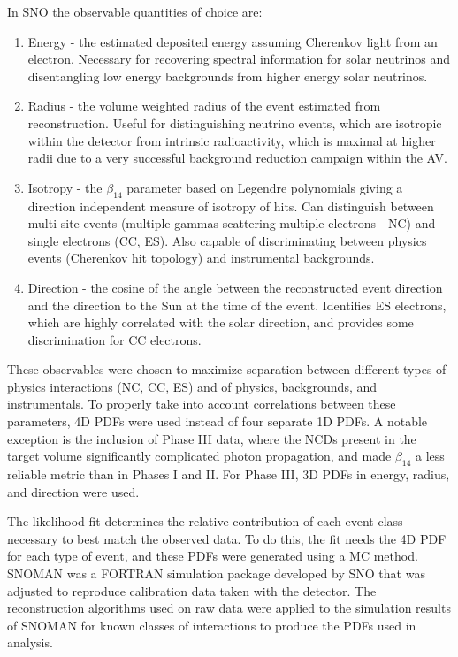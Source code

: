 In SNO the observable quantities of choice are:
\begin{enumerate}
    \item Energy - the estimated deposited energy assuming Cherenkov light from an electron. Necessary for recovering spectral information for solar neutrinos and disentangling low energy backgrounds from higher energy solar neutrinos.
    \item Radius - the volume weighted radius of the event estimated from reconstruction. Useful for distinguishing neutrino events, which are isotropic within the detector from intrinsic radioactivity, which is maximal at higher radii due to a very successful background reduction campaign within the AV.
    \item Isotropy - the $\beta_{14}$ parameter based on Legendre polynomials giving a direction independent measure of isotropy of hits. Can distinguish between multi site events (multiple gammas scattering multiple electrons - NC) and single electrons (CC, ES). Also capable of discriminating between physics events (Cherenkov hit topology) and instrumental backgrounds.
    \item Direction - the cosine of the angle between the reconstructed event direction and the direction to the Sun at the time of the event. Identifies ES electrons, which are highly correlated with the solar direction, and provides some discrimination for CC electrons.
\end{enumerate}
These observables were chosen to maximize separation between different types of physics interactions (NC, CC, ES) and of physics, backgrounds, and instrumentals. 
To properly take into account correlations between these parameters, 4D PDFs were used instead of four separate 1D PDFs.
A notable exception is the inclusion of Phase III data, where the NCDs present in the target volume significantly complicated photon propagation, and made $\beta_{14}$ a less reliable metric than in Phases I and II.
For Phase III, 3D PDFs in energy, radius, and direction were used.

The likelihood fit determines the relative contribution of each event class necessary to best match the observed data.
To do this, the fit needs the 4D PDF for each type of event, and these PDFs were generated using a MC method.
SNOMAN \cite{sno_nim} was a FORTRAN simulation package developed by SNO that was adjusted to reproduce calibration data taken with the detector.
The reconstruction algorithms used on raw data were applied to the simulation results of SNOMAN for known classes of interactions to produce the PDFs used in analysis.

